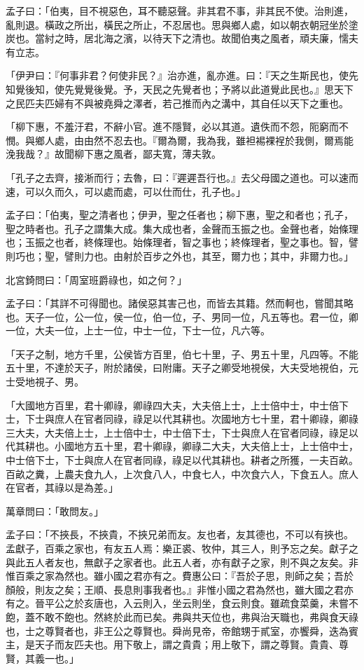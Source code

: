 
\begin{pinyinscope}
孟子曰：「伯夷，目不視惡色，耳不聽惡聲。非其君不事，非其民不使。治則進，亂則退。橫政之所出，橫民之所止，不忍居也。思與鄉人處，如以朝衣朝冠坐於塗炭也。當紂之時，居北海之濱，以待天下之清也。故聞伯夷之風者，頑夫廉，懦夫有立志。

「伊尹曰：『何事非君？何使非民？』治亦進，亂亦進。曰：『天之生斯民也，使先知覺後知，使先覺覺後覺。予，天民之先覺者也；予將以此道覺此民也。』思天下之民匹夫匹婦有不與被堯舜之澤者，若己推而內之溝中，其自任以天下之重也。

「柳下惠，不羞汙君，不辭小官。進不隱賢，必以其道。遺佚而不怨，阨窮而不憫。與鄉人處，由由然不忍去也。『爾為爾，我為我，雖袒裼裸裎於我側，爾焉能浼我哉？』故聞柳下惠之風者，鄙夫寬，薄夫敦。

「孔子之去齊，接淅而行；去魯，曰：『遲遲吾行也。』去父母國之道也。可以速而速，可以久而久，可以處而處，可以仕而仕，孔子也。」

孟子曰：「伯夷，聖之清者也；伊尹，聖之任者也；柳下惠，聖之和者也；孔子，聖之時者也。孔子之謂集大成。集大成也者，金聲而玉振之也。金聲也者，始條理也；玉振之也者，終條理也。始條理者，智之事也；終條理者，聖之事也。智，譬則巧也；聖，譬則力也。由射於百步之外也，其至，爾力也；其中，非爾力也。」

北宮錡問曰：「周室班爵祿也，如之何？」

孟子曰：「其詳不可得聞也。諸侯惡其害己也，而皆去其籍。然而軻也，嘗聞其略也。天子一位，公一位，侯一位，伯一位，子、男同一位，凡五等也。君一位，卿一位，大夫一位，上士一位，中士一位，下士一位，凡六等。

「天子之制，地方千里，公侯皆方百里，伯七十里，子、男五十里，凡四等。不能五十里，不達於天子，附於諸侯，曰附庸。天子之卿受地視侯，大夫受地視伯，元士受地視子、男。

「大國地方百里，君十卿祿，卿祿四大夫，大夫倍上士，上士倍中士，中士倍下士，下士與庶人在官者同祿，祿足以代其耕也。次國地方七十里，君十卿祿，卿祿三大夫，大夫倍上士，上士倍中士，中士倍下士，下士與庶人在官者同祿，祿足以代其耕也。小國地方五十里，君十卿祿，卿祿二大夫，大夫倍上士，上士倍中士，中士倍下士，下士與庶人在官者同祿，祿足以代其耕也。耕者之所獲，一夫百畝。百畝之糞，上農夫食九人，上次食八人，中食七人，中次食六人，下食五人。庶人在官者，其祿以是為差。」

萬章問曰：「敢問友。」

孟子曰：「不挾長，不挾貴，不挾兄弟而友。友也者，友其德也，不可以有挾也。孟獻子，百乘之家也，有友五人焉：樂正裘、牧仲，其三人，則予忘之矣。獻子之與此五人者友也，無獻子之家者也。此五人者，亦有獻子之家，則不與之友矣。非惟百乘之家為然也。雖小國之君亦有之。費惠公曰：『吾於子思，則師之矣；吾於顏般，則友之矣；王順、長息則事我者也。』非惟小國之君為然也，雖大國之君亦有之。晉平公之於亥唐也，入云則入，坐云則坐，食云則食。雖疏食菜羹，未嘗不飽，蓋不敢不飽也。然終於此而已矣。弗與共天位也，弗與治天職也，弗與食天祿也，士之尊賢者也，非王公之尊賢也。舜尚見帝，帝館甥于貳室，亦饗舜，迭為賓主，是天子而友匹夫也。用下敬上，謂之貴貴；用上敬下，謂之尊賢。貴貴、尊賢，其義一也。」


\end{pinyinscope}
